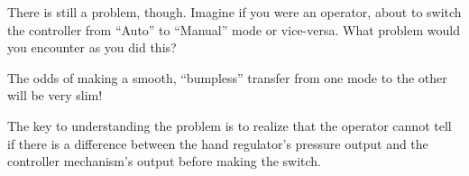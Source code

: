 There is still a problem, though.  Imagine if you were an operator, about to switch the controller from ``Auto'' to ``Manual'' mode or vice-versa.  What problem would you encounter as you did this?







The odds of making a smooth, ``bumpless'' transfer from one mode to the other will be very slim!







The key to understanding the problem is to realize that the operator cannot tell if there is a difference between the hand regulator's pressure output and the controller mechanism's output before making the switch.




